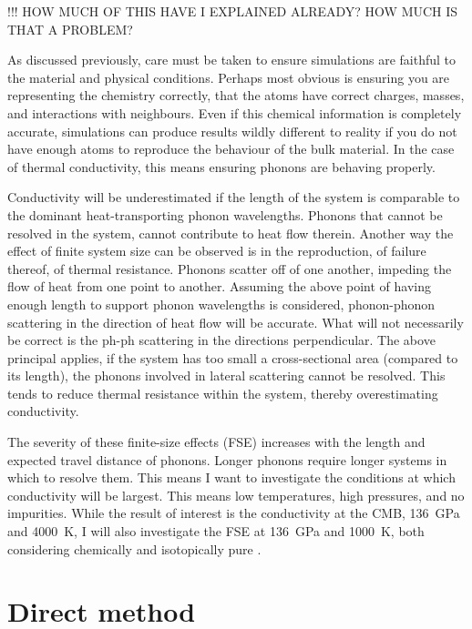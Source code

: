 !!! HOW MUCH OF THIS HAVE I EXPLAINED ALREADY? HOW MUCH IS THAT A PROBLEM?

As discussed previously, care must be taken to ensure simulations are faithful to the material and physical conditions. Perhaps most obvious is ensuring you are representing the chemistry correctly, that the atoms have correct charges, masses, and interactions with neighbours. Even if this chemical information is completely accurate, simulations can produce results wildly different to reality if you do not have enough atoms to reproduce the behaviour of the bulk material. In the case of thermal conductivity, this means ensuring phonons are behaving properly.

Conductivity will be underestimated if the length of the system is comparable to the dominant heat-transporting phonon wavelengths. Phonons that cannot be resolved in the system, cannot contribute to heat flow therein. Another way the effect of finite system size can be observed is in the reproduction, of failure thereof, of thermal resistance. Phonons scatter off of one another, impeding the flow of heat from one point to another. Assuming the above point of having enough length to support phonon wavelengths is considered, phonon-phonon scattering in the direction of heat flow will be accurate. What will not necessarily be correct is the ph-ph scattering in the directions perpendicular. The above principal applies, if the system has too small a cross-sectional area (compared to its length), the phonons involved in lateral scattering cannot be resolved. This tends to reduce thermal resistance within the system, thereby overestimating conductivity.

The severity of these finite-size effects (FSE) increases with the length and expected travel distance of phonons. Longer phonons require longer systems in which to resolve them. This means I want to investigate the conditions at which conductivity will be largest. This means low temperatures, high pressures, and no impurities. While the result of interest is the conductivity at the CMB, 136~GPa and 4000~K, I will also investigate the FSE at 136~GPa  and 1000~K, both considering chemically and isotopically pure \mgsios \bdg.



\section{\label{sec:3.direct}Direct method}

